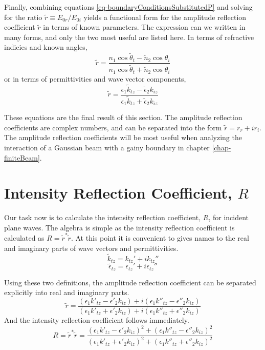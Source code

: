 \documentclass[12pt]{uthesis-v12}
\begin{document}
Finally, combining equations \ref{eq-boundaryConditionsSubstitutedP} and solving for the ratio $\tilde{r}\equiv E_{0r}/E_{0i}$ yields a functional form for the amplitude reflection coefficient $\tilde{r}$ in terms of known parameters.  The expression can we written in many forms, and only the two most useful are listed here. In terms of refractive indicies and known angles,
\begin{equation}\label{eq-r(n,theta)}
\tilde{r}=\frac{n_1\cos\tilde{\theta}_t-\tilde{n}_2\cos\theta_i}
{n_1\cos\tilde{\theta}_t+\tilde{n}_2\cos\theta_i}
\end{equation}
or in terms of permittivities and wave vector components,
\begin{equation}\label{eq-r(k,epsilon)}
\tilde{r}=\frac{\epsilon_1\tilde{k}_{tz}-\tilde{\epsilon}_2k_{iz}}{\epsilon_1\tilde{k}_{tz}+\tilde{\epsilon}_2k_{iz}}
\end{equation}

These equations are the final result of this section. The amplitude reflection coefficients are complex numbers, and can be separated into the form $\tilde{r}=r_r+ir_i$. The amplitude reflection coefficients will be most useful when analyzing the interaction of a Gaussian beam with a gainy boundary in chapter \ref{chap-finiteBeam}.

\section{Intensity Reflection Coefficient, $R$}\label{planeWaves-R}
Our task now is to calculate the intensity reflection coefficient, $R$, for incident plane waves. The algebra is simple as the intensity reflection coefficient is calculated as $R=\tilde{r}^*\tilde{r}$. At this point it is convenient to gives names to the real and imaginary parts of wave vectors and permittivities.
\begin{equation}\label{eq-kPrimesDefinition}
\tilde{k}_{tz}=k_{tz}'+ik_{tz}''
\end{equation}\begin{equation}
\tilde{\epsilon}_{tz}=\epsilon_{tz}'+i\epsilon_{tz}''
\end{equation}
 
Using these two definitions, the amplitude reflection coefficient can be separated explicitly into real and imaginary parts.
\begin{equation}
\tilde{r}=\frac{
(\epsilon_1 k'_{tz}-\epsilon'_2k_{iz}) +i (\epsilon_1 k''_{tz}-\epsilon''_2k_{iz})
}{
(\epsilon_1 k'_{tz}+\epsilon'_2k_{iz}) +i (\epsilon_1 k''_{tz}+\epsilon''_2k_{iz})
}
\end{equation}
And the intensity reflection coefficient follows immediately.
\begin{equation}\label{eq-R}
R=\tilde{r}^*\tilde{r}=\frac{
(\epsilon_1 k'_{tz}-\epsilon'_2 k_{iz})^2 + (\epsilon_1 k''_{tz}-\epsilon''_2 k_{iz})^2
}{
(\epsilon_1 k'_{tz}+\epsilon'_2 k_{iz})^2 + (\epsilon_1 k''_{tz}+\epsilon''_2 k_{iz})^2
}
\end{equation}
\end{document}
